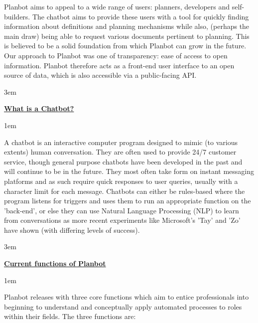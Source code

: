 \documentclass[12pt, a4paper]{article}
\begin{document}
  Planbot aims to appeal to a wide range of users: planners, developers and
  self-builders. The chatbot aims to provide these users with a tool for quickly
  finding information about definitions and planning mechanisms while also,
  (perhaps the main draw) being able to request various documents pertinent to
  planning. This is believed to be a solid foundation from which Planbot can
  grow in the future. Our approach to Planbot was one of transparency: ease of
  access to open information. Planbot therefore acts as a front-end user
  interface to an open source of data, which is also accessible via a
  public-facing API.

    \parskip 3em

  {\large\bfseries\ul{What is a Chatbot?}}

    \parskip 1em

  A chatbot is an interactive computer program designed to mimic (to various
  extents) human conversation. They are often used to provide 24/7 customer
  service, though general purpose chatbots have been developed in the past
  and will continue to be in the future. They most often take form on instant
  messaging platforms and as such require quick responses to user queries,
  usually with a character limit for each message. Chatbots can either be
  rules-based where the program listens for triggers and uses them to run an
  appropriate function on the 'back-end', or else they can use Natural Language
  Processing (NLP) to learn from conversations as more recent experiments like
  Microsoft's 'Tay' and 'Zo' have shown (with differing levels of success).

    \parskip 3em

  {\large\bfseries\ul{Current functions of Planbot}}

    \parskip 1em

  Planbot releases with three core functions which aim to entice professionals
  into beginning to understand and conceptually apply automated processes to
  roles within their fields. The three functions are:
\end{document}
